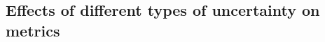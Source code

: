 \documentclass[12pt, oneside]{article}   	%
\begin{document}


\subsection{Effects of different types of uncertainty on metrics}



\end{document}
